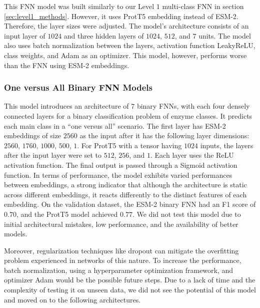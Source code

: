 \documentclass{bioinfo}
\begin{document}
This FNN model was built similarly to our Level $1$ multi-class FNN in section \ref{sec:level1_methods}. 
However, it uses ProtT5 embedding instead of ESM-2. 
Therefore, the layer sizes were adjusted. 
The model’s architecture consists of an input layer of $1024$ and three hidden layers of $1024$, $512$, and $7$ units. 
The model also uses batch normalization between the layers, activation function LeakyReLU, class weights, and Adam as an optimizer. 
This model, however, performs worse than the FNN using ESM-2 embeddings. 

\subsubsection{One versus All Binary FNN Models}
This model introduces an architecture of $7$ binary FNNs, with each four densely connected layers for a binary classification problem 
of enzyme classes. It predicts each main class in a ``one versus all'' scenario. The first layer has ESM-2 embeddings of size $2560$ as 
the input after it has the following layer dimensions: $2560$, $1760$, $1000$, $500$, $1$. 
For ProtT5 with a tensor having $1024$ inputs, the layers after the input layer were set to $512$, $256$, and $1$.
Each layer uses the ReLU activation function. The final output is passed through a Sigmoid activation function. 
In terms of performance, the model exhibits varied performances between embeddings, a strong indicator that although the architecture 
is static across different embeddings, it reacts differently to the distinct features of each embedding. 
On the validation dataset, the ESM-2 binary FNN had an F1 score of $0.70$, and the ProtT5 model achieved $0.77$. 
We did not test this model due to initial architectural mistakes, low performance, and the availability of better models. 

Moreover, regularization techniques like dropout can mitigate the overfitting problem experienced in networks of this nature. 
To increase the performance, batch normalization, using a hyperparameter optimization framework, and optimizer Adam would be the possible future steps. 
Due to a lack of time and the complexity of testing it on unseen data, we did not see the potential of this model and moved on to the following architectures. 
\end{document}
